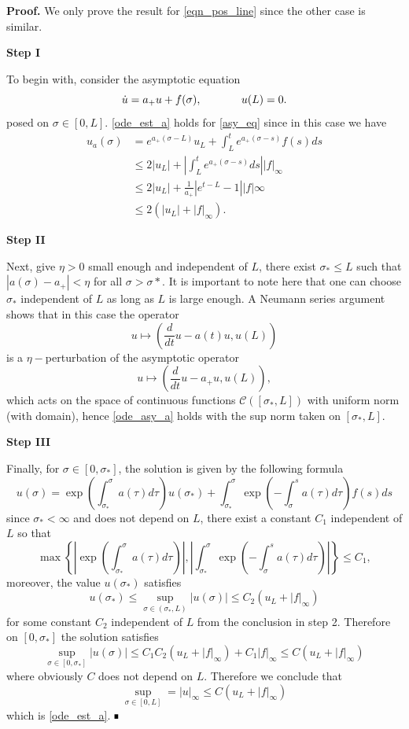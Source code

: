 \documentclass[letterpaper,11pt]{article}
\numberwithin{equation}{section}
\theoremstyle{plain}
\newenvironment{Proof}[1][.]%
 {\begin{trivlist}\item[]\textbf{Proof#1 }}%
 {\hspace*{\fill}$\rule{0.3\baselineskip}{0.35\baselineskip}$\end{trivlist}}
\begin{document}
\begin{Proof}
We only prove the result for \eqref{eqn_pos_line} since the other case is similar. 

\textbf{Step I}

To begin with, consider the asymptotic equation 
\begin{equation}\label{asy_eq}
\dot{u} = a_+ u + f(\sigma),\hspace{ 0.5in } u(L) = 0.
\end{equation}
posed on $\sigma \in [0, L]$.
\eqref{ode_est_a} holds for \eqref{asy_eq} since in this case we have
\begin{align*}
u_a(\sigma) &= e^{a_+(\sigma-L)}u_L + \int_L^t e^{a_+(\sigma-s)} f(s)ds \\ 
&\le 2|u_L| + \left|\int_L^t e^{a_+(\sigma-s)}ds \right| |f|_\infty\\ 
&\le  2|u_L|+\frac{1}{a_+} \left|e^{t-L}-1\right||f|\infty\\
& \le 2(|u_L|+|f|_\infty ).
\end{align*}

\textbf{Step II}

Next, give $\eta>0$ small enough and independent of $L$, there exist $\sigma_* \le L$ such that $|a(\sigma)- a_+|< \eta$ for all $\sigma>\sigma*$. It is important to note here that one can choose $\sigma_*$ independent of $L$ as long as $L$ is large enough. A Neumann series argument shows that in this case the operator 
\[ u \mapsto
 \left(\frac{d}{dt}u-a(t)u, u(L)\right)
\] is a $\eta-$perturbation of the asymptotic operator
\[ u \mapsto
 \left(\frac{d}{dt}u-a_+u, u(L)\right),
\]
which acts on the space of continuous functions $\mathcal{C}([\sigma_*,L])$ with uniform norm (with domain), hence \eqref{ode_asy_a} holds with the sup norm taken on $[\sigma_*, L]$.

\textbf{Step III}

Finally, for $\sigma \in [0,\sigma_*]$, the solution is given by the following formula
\[
u(\sigma) = \exp\left(\int^{\sigma}_{\sigma_*} a(\tau)d\tau\right) u(\sigma_*) + \int_{\sigma_*}^{\sigma} \exp\left(-\int_{\sigma}^{s}a(\tau)d\tau\right)f(s)ds 
\]
since $\sigma_*< \infty$ and does not depend on $L$, there exist a constant $C_1$ independent of $L$ so that 
\[
\max\left\{ \left|\exp\left(\int^{\sigma}_{\sigma_*} a(\tau)d\tau\right)\right|, \left| \int_{\sigma_*}^{\sigma} \exp\left(-\int_{\sigma}^{s}a(\tau)d\tau\right)\right| \right\} \le C_1,
\]
moreover, the value $u(\sigma_*)$ satisfies
\[
u(\sigma_*) \le \sup_{\sigma \in (\sigma_*,L)} |u(\sigma)| \le C_2(u_L + |f|_\infty)
\]
for some constant $C_2$ independent of $L$ from the conclusion in step 2.
Therefore on $[0,\sigma_*]$ the solution satisfies
\[
\sup_{\sigma \in [0,\sigma_*]}|u(\sigma)| \le C_1C_2(u_L+|f|_\infty) +C_1|f|_\infty \le C(u_L+|f|_\infty)
\]
where obviously $C$ does not depend on $L$. Therefore we conclude that
\[
\sup_{\sigma \in [0,L]} = |u|_\infty \le C(u_L+|f|_\infty)
\]
which is \eqref{ode_est_a}.
\nocite{*}
\end{Proof}





\end{document}

